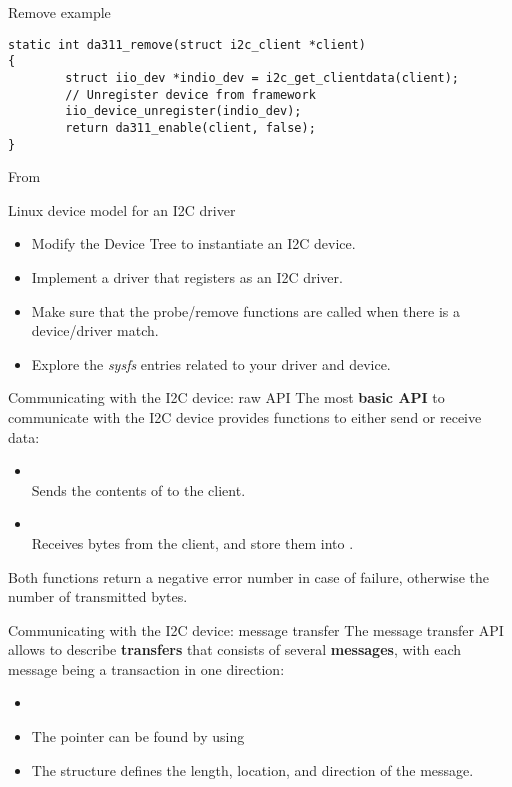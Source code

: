 \begin{frame}[fragile]{Remove example}
  \begin{block}{}
    \begin{verbatim}
static int da311_remove(struct i2c_client *client)
{
        struct iio_dev *indio_dev = i2c_get_clientdata(client);
        // Unregister device from framework
        iio_device_unregister(indio_dev);
        return da311_enable(client, false);
}
    \end{verbatim}
  \end{block}
  From 
\end{frame}

\setuplabframe
{Linux device model for an I2C driver}
{
  \begin{itemize}
  \item Modify the Device Tree to instantiate an I2C device.
  \item Implement a driver that registers as an I2C driver.
  \item Make sure that the probe/remove functions are called
        when there is a device/driver match.
  \item Explore the {\em sysfs} entries related to your driver and
    device.
  \end{itemize}
}

\begin{frame}{Communicating with the I2C device: raw API}
  The most {\bf basic API} to communicate with the I2C device provides
  functions to either send or receive data:
  \begin{itemize}
  \item
    \\Sends the contents of  to the client.
  \item
    \\Receives {} bytes from the client, and store them into
    .
  \end{itemize}
  Both functions return a negative error number in case of failure, otherwise the
  number of transmitted bytes.
\end{frame}

\begin{frame}{Communicating with the I2C device: message transfer}
  The message transfer API allows to describe {\bf transfers} that
  consists of several {\bf messages}, with each message being a
  transaction in one direction:
  \begin{itemize}
  \item
  \item The  pointer can be found by using
  \item The  structure defines the length, location, and
    direction of the message.
  \end{itemize}
\end{frame}

